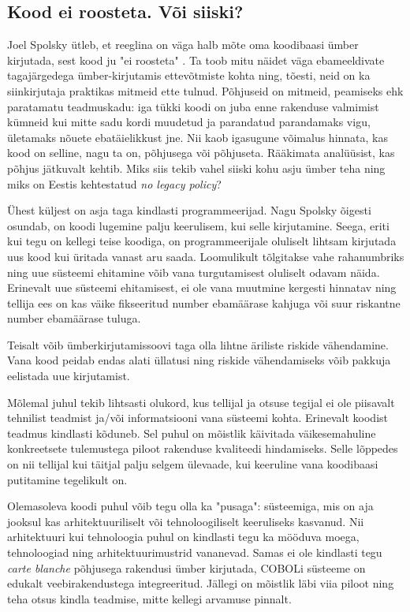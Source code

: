 \documentclass{article}
\begin{document}
\subsection{Kood ei roosteta. Või siiski?}
Joel Spolsky ütleb, et reeglina on väga halb mõte oma koodibaasi ümber kirjutada, sest kood ju "ei roosteta" \citep{joelrust}. Ta toob mitu näidet väga ebameeldivate tagajärgedega ümber-kirjutamis ettevõtmiste kohta ning, tõesti, neid on ka siinkirjutaja praktikas mitmeid ette tulnud. Põhjuseid on mitmeid, peamiseks ehk paratamatu teadmuskadu: iga tükki koodi on juba enne rakenduse valmimist kümneid kui mitte sadu kordi muudetud ja parandatud parandamaks vigu, ületamaks nõuete ebatäielikkust jne. Nii kaob igasugune võimalus hinnata, kas kood on selline, nagu ta on, põhjusega või põhjuseta. Rääkimata analüüsist, kas põhjus jätkuvalt kehtib. Miks siis tekib vahel siiski kohu asju ümber teha ning miks on Eestis kehtestatud \emph{no legacy policy}?

Ühest küljest on asja taga kindlasti programmeerijad. Nagu Spolsky õigesti osundab, on koodi lugemine palju keerulisem, kui selle kirjutamine. Seega, eriti kui tegu on kellegi teise koodiga, on programmeerijale oluliselt lihtsam kirjutada uus kood kui üritada vanast aru saada. Loomulikult tõlgitakse vahe rahanumbriks ning uue süsteemi ehitamine võib vana turgutamisest oluliselt odavam näida. Erinevalt uue süsteemi ehitamisest, ei ole vana muutmine kergesti hinnatav ning tellija ees on kas väike fikseeritud number ebamäärase kahjuga või suur riskantne number ebamäärase tuluga. 

Teisalt võib ümberkirjutamissoovi taga olla lihtne äriliste riskide vähendamine. Vana kood peidab endas alati üllatusi ning riskide vähendamiseks võib pakkuja eelistada uue kirjutamist. 

Mõlemal juhul tekib lihtsasti olukord, kus tellijal ja otsuse tegijal ei ole piisavalt tehnilist teadmist ja/või informatsiooni vana süsteemi kohta. Erinevalt koodist teadmus kindlasti kõduneb. Sel puhul on mõistlik käivitada väikesemahuline konkreetsete tulemustega piloot rakenduse kvaliteedi hindamiseks. Selle lõppedes on nii tellijal kui täitjal palju selgem ülevaade, kui keeruline vana koodibaasi putitamine tegelikult on.

Olemasoleva koodi puhul võib tegu olla ka "pusaga": süsteemiga, mis on aja jooksul kas arhitektuuriliselt või tehnoloogiliselt keeruliseks kasvanud. Nii arhitektuuri kui tehnoloogia puhul on kindlasti tegu ka mööduva moega, tehno\-loogiad ning arhitektuurimustrid vananevad. Samas ei ole kindlasti tegu \textit{carte blanche} põhjusega rakendusi ümber kirjutada, COBOLi süsteeme on edukalt veebirakendustega integreeritud. Jällegi on mõistlik läbi viia piloot ning teha otsus kindla teadmise, mitte kellegi arvamuse pinnalt.
\end{document}
